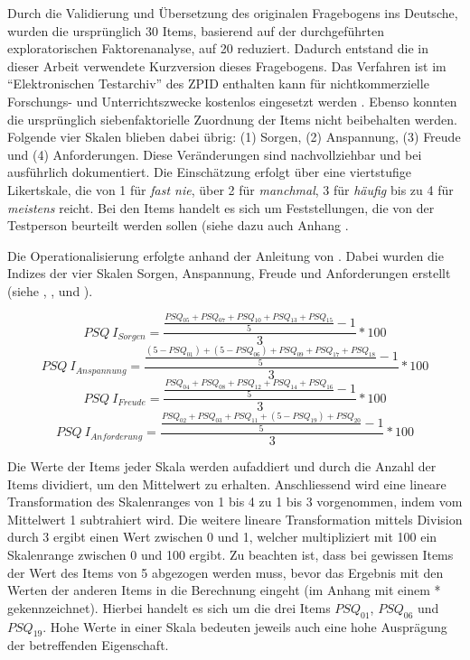 Durch die Validierung und Übersetzung des originalen Fragebogens ins Deutsche, wurden die ursprünglich 30 Items, basierend auf der durchgeführten exploratorischen Faktorenanalyse, auf 20 reduziert. Dadurch entstand die in dieser Arbeit verwendete Kurzversion dieses Fragebogens. Das Verfahren ist im \enquote{Elektronischen Testarchiv} des ZPID enthalten kann für nichtkommerzielle Forschungs- und Unterrichtszwecke kostenlos eingesetzt werden \cite{ZPID}. Ebenso konnten die ursprünglich siebenfaktorielle Zuordnung der Items nicht beibehalten werden. Folgende vier Skalen blieben dabei übrig: (1) Sorgen, (2) Anspannung, (3) Freude und (4) Anforderungen. Diese Veränderungen sind nachvollziehbar und bei  ausführlich dokumentiert. Die Einschätzung erfolgt über eine viertstufige Likertskale, die von 1 für \textit{fast nie}, über 2 für \textit{manchmal}, 3 für \textit{häufig} bis zu 4 für \textit{meistens} reicht. Bei den Items handelt es sich um Feststellungen, die von der Testperson beurteilt werden sollen (siehe dazu auch Anhang . 

Die Operationalisierung erfolgte anhand der Anleitung von . Dabei wurden die Indizes der vier Skalen Sorgen, Anspannung, Freude und Anforderungen erstellt (siehe , ,  und ). 

\begin{equation}\label{eq:PSQIndexSorgen}
    PSQ~I_{Sorgen}=\frac{\frac{PSQ_{05}+PSQ_{07}+PSQ_{10}+PSQ_{13}+PSQ_{15}}{5}-1}{3}*100
\end{equation}
\begin{equation}\label{eq:PSQIndexAnspannung}
    PSQ~I_{Anspannung}=\frac{\frac{(5-PSQ_{01})+(5-PSQ_{06})+PSQ_{09}+PSQ_{17}+PSQ_{18}}{5}-1}{3}*100
\end{equation}
\begin{equation}\label{eq:PSQIndexFreude}
    PSQ~I_{Freude}=\frac{\frac{PSQ_{04}+PSQ_{08}+PSQ_{12}+PSQ_{14}+PSQ_{16}}{5}-1}{3}*100
\end{equation}
\begin{equation}\label{eq:PSQIndexAnforderung}
    PSQ~I_{Anforderung}=\frac{\frac{PSQ_{02}+PSQ_{03}+PSQ_{11}+(5-PSQ_{19})+PSQ_{20}}{5}-1}{3}*100
\end{equation}

Die Werte der Items jeder Skala werden aufaddiert und durch die Anzahl der Items dividiert, um den Mittelwert zu erhalten. Anschliessend wird eine lineare Transformation des Skalenranges von 1 bis 4 zu 1 bis 3 vorgenommen, indem vom Mittelwert 1 subtrahiert wird. Die weitere lineare Transformation mittels Division durch 3 ergibt einen Wert zwischen 0 und 1, welcher multipliziert mit 100 ein Skalenrange zwischen 0 und 100 ergibt. Zu beachten ist, dass bei gewissen Items der Wert des Items von 5 abgezogen werden muss, bevor das Ergebnis mit den Werten der anderen Items in die Berechnung eingeht (im Anhang  mit einem * gekennzeichnet). Hierbei handelt es sich um die drei Items $PSQ_{01}$, $PSQ_{06}$ und $PSQ_{19}$. Hohe Werte in einer Skala bedeuten jeweils auch eine hohe Ausprägung der betreffenden Eigenschaft.

